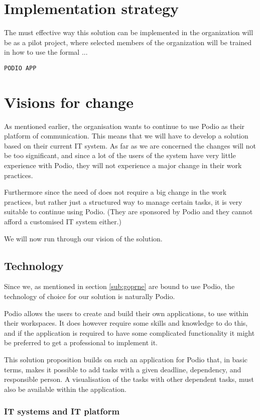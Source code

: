 \section{Implementation strategy}
The must effective way this solution can be implemented in the organization will be as a pilot project, where selected members of the organization will be trained in how to use the formal ... 



\texttt{PODIO APP}
\section{Visions for change}
As mentioned earlier, the organisation wants to continue to use Podio as their platform of
communication. This means that we will have to develop a solution based on their current IT system.
As far as we are concerned the changes will not be too significant, and since a lot of the users of
the system have very little experience with Podio, they will not experience a major change in their
work practices. 

Furthermore since the need of \mil does not require a big change in the work practices, but rather
just a structured way to manage certain tasks, it is very suitable to continue using Podio. (They
are sponsored by Podio and they cannot afford a customised IT system either.)

We will now run through our vision of the solution.

\subsection{Technology}
\label{sub:technology}
Since we, as mentioned in section \ref{sub:goprne} are bound to use Podio, the technology of choice
for our solution is naturally Podio. 

Podio allows the users to create and build their own applications, to use within their workspaces.
It does however require some skills and knowledge to do this, and if the application is required to
have some complicated functionality it might be preferred to get a professional to implement it.

This solution proposition builds on such an application for Podio that, in basic terms, makes it possible to add
tasks with a given deadline, dependency, and responsible person. A visualisation of the tasks with
other dependent tasks, must also be available within the application. 

\subsubsection{IT systems and IT platform}

